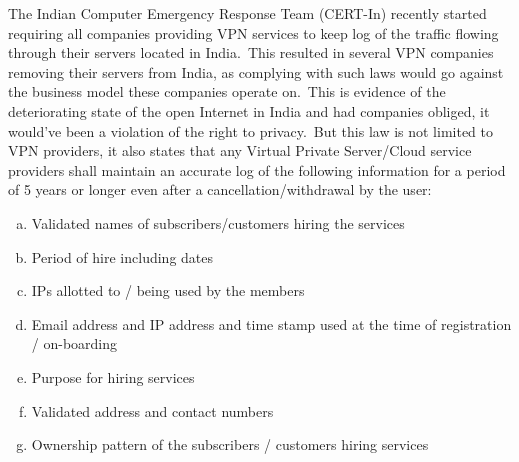 \documentclass[11pt,a4paper,oneside]{scrarticle}
\begin{document}
    The Indian Computer Emergency Response Team (CERT-In) recently started requiring all companies providing VPN
    services to keep log of the traffic flowing through their servers located in India.\ This resulted in several VPN
    companies removing their servers from India, as complying with such laws would go against the business model these
    companies operate on.\ This is evidence of the deteriorating state of the open Internet in India and had companies
    obliged, it would've been a violation of the right to privacy.\ But this law is not limited to VPN providers, it
    also states that any Virtual Private Server/Cloud service providers shall maintain an accurate log of the following
    information for a period of 5 years or longer even after a cancellation/withdrawal by the user:

    \begin{enumerate}[(a)]
        \singlespacing
        \item Validated names of subscribers/customers hiring the services
        \item Period of hire including dates
        \item IPs allotted to / being used by the members
        \item Email address and IP address and time stamp used at the time of registration / on-boarding
        \item Purpose for hiring services
        \item Validated address and contact numbers
        \item Ownership pattern of the subscribers / customers hiring services
    \end{enumerate}
\end{document}
